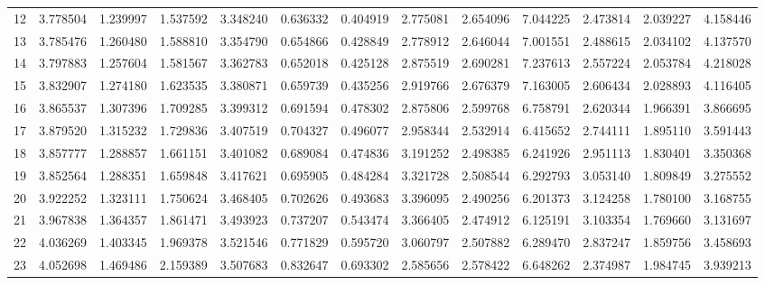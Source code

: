 \begin{tabular}{lrrrrrrrrrrrr}
12 & 3.778504 & 1.239997 & 1.537592 & 3.348240 & 0.636332 & 0.404919 & 2.775081 & 2.654096 & 7.044225 & 2.473814 & 2.039227 & 4.158446 \\
13 & 3.785476 & 1.260480 & 1.588810 & 3.354790 & 0.654866 & 0.428849 & 2.778912 & 2.646044 & 7.001551 & 2.488615 & 2.034102 & 4.137570 \\
14 & 3.797883 & 1.257604 & 1.581567 & 3.362783 & 0.652018 & 0.425128 & 2.875519 & 2.690281 & 7.237613 & 2.557224 & 2.053784 & 4.218028 \\
15 & 3.832907 & 1.274180 & 1.623535 & 3.380871 & 0.659739 & 0.435256 & 2.919766 & 2.676379 & 7.163005 & 2.606434 & 2.028893 & 4.116405 \\
16 & 3.865537 & 1.307396 & 1.709285 & 3.399312 & 0.691594 & 0.478302 & 2.875806 & 2.599768 & 6.758791 & 2.620344 & 1.966391 & 3.866695 \\
17 & 3.879520 & 1.315232 & 1.729836 & 3.407519 & 0.704327 & 0.496077 & 2.958344 & 2.532914 & 6.415652 & 2.744111 & 1.895110 & 3.591443 \\
18 & 3.857777 & 1.288857 & 1.661151 & 3.401082 & 0.689084 & 0.474836 & 3.191252 & 2.498385 & 6.241926 & 2.951113 & 1.830401 & 3.350368 \\
19 & 3.852564 & 1.288351 & 1.659848 & 3.417621 & 0.695905 & 0.484284 & 3.321728 & 2.508544 & 6.292793 & 3.053140 & 1.809849 & 3.275552 \\
20 & 3.922252 & 1.323111 & 1.750624 & 3.468405 & 0.702626 & 0.493683 & 3.396095 & 2.490256 & 6.201373 & 3.124258 & 1.780100 & 3.168755 \\
21 & 3.967838 & 1.364357 & 1.861471 & 3.493923 & 0.737207 & 0.543474 & 3.366405 & 2.474912 & 6.125191 & 3.103354 & 1.769660 & 3.131697 \\
22 & 4.036269 & 1.403345 & 1.969378 & 3.521546 & 0.771829 & 0.595720 & 3.060797 & 2.507882 & 6.289470 & 2.837247 & 1.859756 & 3.458693 \\
23 & 4.052698 & 1.469486 & 2.159389 & 3.507683 & 0.832647 & 0.693302 & 2.585656 & 2.578422 & 6.648262 & 2.374987 & 1.984745 & 3.939213 \\
\bottomrule
\end{tabular}
